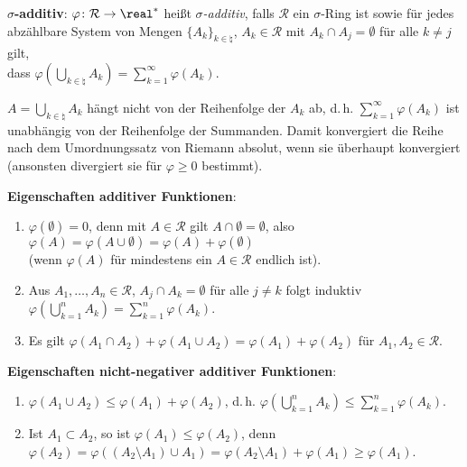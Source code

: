 \textbf{$\sigma$-additiv}:
$\varphi\colon \mathcal{R} \rightarrow \real^\ast$ heißt
\emph{$\sigma$-additiv}, falls $\mathcal{R}$ ein $\sigma$-Ring ist sowie für
jedes abzählbare System von Mengen $\{A_k\}_{k \in \natural}$,
$A_k \in \mathcal{R}$ mit $A_k \cap A_j = \emptyset$
für alle $k \not= j$ gilt, \\
dass $\varphi\left(\bigcup_{k \in \natural} A_k\right) =
\sum_{k=1}^\infty \varphi(A_k)$.

$A = \bigcup_{k \in \natural} A_k$ hängt nicht von der Reihenfolge der $A_k$
ab, d.\,h. $\sum_{k=1}^\infty \varphi(A_k)$ ist unabhängig von der Reihenfolge
der Summanden.
Damit konvergiert die Reihe nach dem Umordnungssatz von Riemann absolut,
wenn sie überhaupt konvergiert (ansonsten divergiert sie für
$\varphi \ge 0$ bestimmt).

\textbf{Eigenschaften additiver Funktionen}:
\begin{enumerate}
    \item
    $\varphi(\emptyset) = 0$, denn mit $A \in \mathcal{R}$ gilt
    $A \cap \emptyset = \emptyset$, also
    $\varphi(A) = \varphi(A \cup \emptyset) =
    \varphi(A) + \varphi(\emptyset)$ \\
    (wenn $\varphi(A)$ für mindestens ein $A \in \mathcal{R}$ endlich ist).

    \item
    Aus $A_1, \dotsc, A_n \in \mathcal{R}$, $A_j \cap A_k = \emptyset$ für alle
    $j \not= k$ folgt induktiv
    $\varphi\left(\bigcup_{k=1}^n A_k\right) = \sum_{k=1}^n \varphi(A_k)$.

    \item
    Es gilt $\varphi(A_1 \cap A_2) + \varphi(A_1 \cup A_2) =
    \varphi(A_1) + \varphi(A_2)$ für $A_1, A_2 \in \mathcal{R}$.
\end{enumerate}

\textbf{Eigenschaften nicht-negativer additiver Funktionen}:
\begin{enumerate}[resume]
    \item
    $\varphi(A_1 \cup A_2) \le \varphi(A_1) + \varphi(A_2)$, d.\,h.
    $\varphi\left(\bigcup_{k=1}^n A_k\right) \le \sum_{k=1}^n \varphi(A_k)$.

    \item
    Ist $A_1 \subset A_2$, so ist $\varphi(A_1) \le \varphi(A_2)$, denn \\
    $\varphi(A_2) = \varphi((A_2 \setminus A_1) \cup A_1) =
    \varphi(A_2 \setminus A_1) + \varphi(A_1) \ge \varphi(A_1)$.
\end{enumerate}

